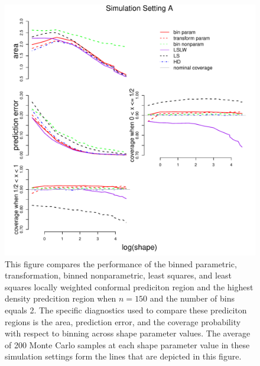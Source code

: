 \documentclass[11pt]{article}\usepackage[]{graphicx}\usepackage[]{color}
\makeatletter
\def\maxwidth{ %
  \ifdim\Gin@nat@width>\linewidth
    \linewidth
  \else
    \Gin@nat@width
  \fi
}
\newenvironment{knitrout}{}{} %
\makeatother
\begin{document}
\newpage
\begin{figure}[h!]
\begin{center}
\begin{knitrout}
\color{fgcolor}
\includegraphics[width=\maxwidth]{figure/Fig-gamma-150-1} 

\end{knitrout}
\end{center}
\caption{This figure compares the performance of the 
  binned parametric,
  transformation, 
  binned nonparametric,
  least squares, and 
  least squares locally weighted conformal prediciton region and the 
  highest density predcition region when $n = 150$ and the number of bins 
  equals 2.  
  The specific diagnostics used to compare these prediciton regions is the 
    area,
    prediction error, and
    the coverage probability with respect to binning  
    across shape parameter values.
  The average of 200 Monte Carlo samples at each shape parameter value in 
  these simulation settings form the lines that are depicted in this figure.}
\label{Fig:gamma.150}
\end{figure}
\end{document}
